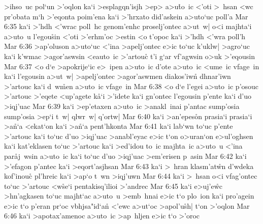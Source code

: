 >ihso~uc
pol`un
>'oqlon
ka`i
>esplagqn'isjh
>ep>
a>u\r{t}o~ic
<'oti
>~hsan
<wc
pr'obata
m`h
>'eqonta
poim'ena
ka`i
>'hrxato
did'askein
a>uto`uc
poll'a\bibvsend
\vs Mar 6:35
ka`i
>'hdh
<'wrac
poll~hc
genom'enhc
proselj'ontec
a>ut~w|
o<i
majhta`i
a>uto~u
l'egou\r{s}in
<'oti
>'erhm'oc
>estin
<o
t'opoc
ka`i
>'hdh
<'wra
poll'h\bibvsend
\vs Mar 6:36
>ap'oluson
a>uto`uc
<'ina
>apelj'ontec
e>ic
to`uc
k'uklw|
>agro`uc
ka`i
k'wmac
>agor'aswsin
<eauto~ic
>'artouc\r{}
t'i
g`ar
vf'agwsin
o>uk
>'eqousin\bibvsend
\vs Mar 6:37
<o
d`e
>apokrije`ic
e>~ipen
a>uto~ic
d'ote
a>uto~ic
<ume~ic
vfage~in
ka`i
l'egousin
a>ut~w|
>apelj'ontec
>agor'aswmen
diakos'iwn\r{}
dhnar'iwn
>'artouc
ka`i
d~w\r{m}en
a>uto~ic
vfage~in\bibvsend
\vs Mar 6:38
<o
d`e
l'egei
a>uto~ic
p'osouc
>'artouc
>'eqete
<up'agete
k\r{a}`i
>'idete
ka`i
gn'ontec
l'egousin
p'ente
ka`i
d'uo
>iqj'uac\bibvsend
\vs Mar 6:39
ka`i
>ep'etaxen
a>uto~ic
>anakl~inai
p'antac
sump'osia
sump'osia
>ep`i
t~w|
qlwr~w|
q'ortw|\bibvsend
\vs Mar 6:40
ka`i
>an'epes\r{o}n
prasia`i
prasia`i
>a\r{n}`a
<ekat`on
ka`i
>a\r{n}`a
pent'hkonta\bibvsend
\vs Mar 6:41
ka`i
lab`wn
to`uc
p'ente
>'artouc
ka`i
to`uc
d'uo
>iqj'uac
>anabl'eyac
e>ic
t`on
o>uran`on
e>ul'oghsen
ka`i
kat'eklasen
to`uc
>'artouc
ka`i
>ed'idou
to~ic
majhta~ic
a>uto~u
<'ina
par\r{a}j~wsin
a>uto~ic
ka`i
to`uc
d'uo
>iqj'uac
>em'erisen
p~asin\bibvsend
\vs Mar 6:42
ka`i
>'efagon
p'antec
ka`i
>eqort'asjhsan\bibvsend
\vs Mar 6:43
ka`i
>~hran
klasm'at\r{w}n
d'wdeka
kof'inouc\r{}
pl'hreic
ka`i
>ap`o
t~wn
>iqj'uwn\bibvsend
\vs Mar 6:44
ka`i
>~hsan
o<i
vfag'ontec
to`uc
>'artouc
<w\r{s}e`i
pentakisq'ilioi
>'andrec\bibvsend
\vs Mar 6:45
ka`i
e>uj'e\r{w}c
>hn'agkasen
to`uc
majht`ac
a>uto~u
>emb~hnai
e>ic
t`o
plo~ion
ka`i
pro'agein
e>ic
t`o
p'eran
pr`oc
vbhjsa"id`a\r{n}
<'ewc
a>ut`oc
>apol'u\r{s}h|
t`on
>'oqlon\bibvsend
\vs Mar 6:46
ka`i
>apotax'amenoc
a>uto~ic
>ap~hljen
e>ic
t`o
>'oroc
